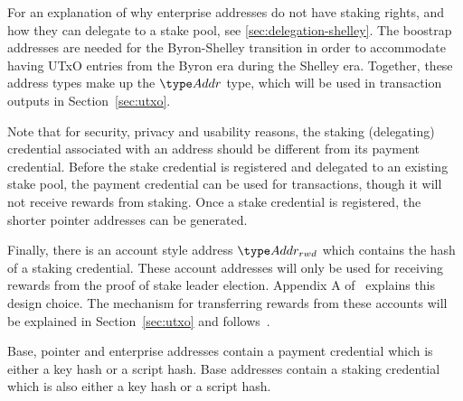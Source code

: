 For an explanation of why enterprise addresses do not have staking rights,
and how they can delegate to a stake pool, see \ref{sec:delegation-shelley}.
The boostrap addresses are needed for the Byron-Shelley transition in order to
accommodate having UTxO entries from the Byron era during the Shelley era.
Together, these address types make up the $\Addr$ type, which will be used
in transaction outputs in Section~\ref{sec:utxo}.

Note that for security, privacy and usability reasons, the staking (delegating)
credential associated with an address should be different from its payment
credential.  Before the stake credential is registered and delegated to an
existing stake pool, the payment credential can be used for transactions, though
it will not receive rewards from staking.  Once a stake credential is
registered, the shorter pointer addresses can be generated.

Finally, there is an account style address $\AddrRWD$ which contains the hash of
a staking credential. These account addresses will only be used for receiving
rewards from the proof of stake leader election. Appendix A
of~\cite{delegation_design} explains this design choice.  The mechanism for
transferring rewards from these accounts will be explained in
Section~\ref{sec:utxo} and follows~\cite{chimeric}.

Base, pointer and enterprise addresses contain a payment credential which is
either a key hash or a script hash. Base addresses contain a staking credential
which is also either a key hash or a script hash.


